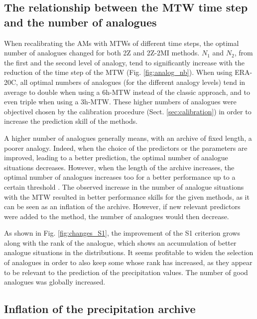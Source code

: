 \documentclass[hess, manuscript]{copernicus}
\begin{document}
	
	\subsection{The relationship between the MTW time step and the number of analogues}
	\label{sec:increase_analognb}
	
	When recalibrating the AMs with MTWs of different time steps, the optimal number of analogues changed for both 2Z and 2Z-2MI methods. $N_{1}$ and $N_{2}$, from the first and the second level of analogy, tend to significantly increase with the reduction of the time step of the MTW (Fig. \ref{fig:analog_nb}). When using ERA-20C, all optimal numbers of analogues (for the different analogy levels) tend in average to double when using a 6h-MTW instead of the classic approach, and to even triple when using a 3h-MTW. These higher numbers of analogues were objectivel chosen by the calibration procedure (Sect. \ref{sec:calibration}) in order to increase the prediction skill of the methods.
	
	A higher number of analogues generally means, with an archive of fixed length, a poorer analogy. Indeed, when the choice of the predictors or the parameters are improved, leading to a better prediction, the optimal number of analogue situations decreases. However, when the length of the archive increases, the optimal number of analogues increases too for a better performance up to a certain threshold \citep[][]{Bontron2004, Hamill2006a}. The observed increase in the number of analogue situations with the MTW resulted in better performance skills for the given methods, as it can be seen as an inflation of the archive. However, if new relevant predictors were added to the method, the number of analogues would then decrease.
	
	As shown in Fig. \ref{fig:changes_S1}, the improvement of the S1 criterion grows along with the rank of the analogue, which shows an accumulation of better analogue situations in the distributions. It seems profitable to widen the selection of analogues in order to also keep some whose rank has increased, as they appear to be relevant to the prediction of the precipitation values. The number of good analogues was globally increased.
	
	
	\subsection{Inflation of the precipitation archive}
	\label{sec:archive_reduction}
	
	
\end{document}
